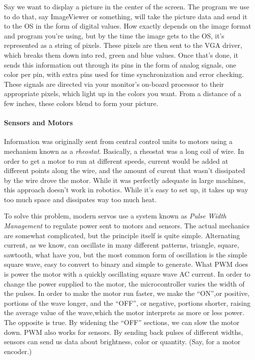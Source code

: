 \documentclass[english]{paper}
\begin{document}
Say we want to display a picture in the center of the screen. The program we use to do that, say ImageViewer or something, will take the picture data and send it to the OS in the form of digital values. How exactly depends on the image format and program you're using, but by the time the image gets to the OS, it's represented as a string of pixels. These pixels are then sent to the VGA driver, which breaks them down into red, green and blue values. Once that's done, it sends this information out through its pins in the form of analog signals, one color per pin, with extra pins used for time synchronization and error checking. These signals are directed via your monitor's on-board processor to their appropriate pixels, which light up in the colors you want. From a distance of a few inches, these colors blend to form your picture.

\paragraph{Sensors and Motors}
Information was originally sent from central control units to motors using a mechanism known as a {\it rheostat}. Basically, a rheostat was a long coil of wire. In order to get a motor to run at different speeds, current would be added at different points along the wire, and the amount of curent that wasn't dissipated by the wire drove the motor. While it was perfectly adequate in large machines, this approach doesn't work in robotics. While it's easy to set up, it takes up way too much space and dissipates way too much heat. 

To solve this problem, modern servos use a system known as {\it Pulse Width Management} to regulate power sent to motors and sensors. The actual mechanics are somewhat complicated, but the principle itself is quite simple. Alternating current, as we know, can oscillate in many different patterns, triangle, square, sawtooth, what have you, but the most common form of oscillation is the simple square wave, easy to convert to binary and simple to generate. What PWM does is power the motor with a quickly oscillating square wave AC current. In order to change the power supplied to the motor, the microcontroller varies the width of the pulses. In order to make the motor run faster, we make the ``ON'',or positive, portions of the wave longer, and the ``OFF'', or negative, portions shorter, raising the average value of the wave,which the motor interprets as more or less power. The opposite is true. By widening the ``OFF'' sections, we can slow the motor down. PWM also works for sensors. By sending back pulses of different widths, sensors can send us data about brightness, color or quantity. (Say, for a motor encoder.)
\end{document}
